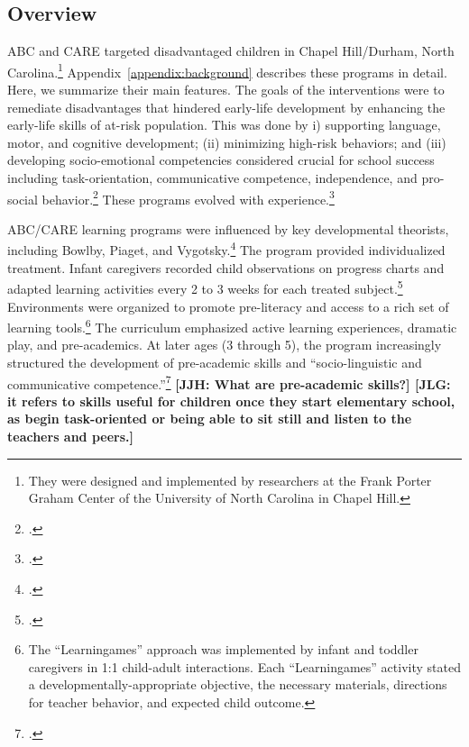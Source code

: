 \subsection{Overview}

ABC and CARE targeted disadvantaged children in Chapel Hill/Durham, North Carolina.\footnote{They were designed and implemented by researchers at the Frank Porter Graham Center of the University of North Carolina in Chapel Hill.} Appendix~\ref{appendix:background} describes these programs in detail. Here, we summarize their main features. The goals of the interventions were to remediate disadvantages that hindered early-life development by enhancing the early-life skills of at-risk population. This was done by i) supporting language, motor, and cognitive development; (ii) minimizing high-risk behaviors; and (iii) developing socio-emotional competencies considered crucial for school success including task-orientation, communicative competence, independence, and pro-social behavior.\footnote{\citet{Ramey_Collier_etal_1976_CarolinaAbecedarianProject, Ramey_etal_1985_Project-CARE_TiECSE, Sparling_1974_Synth_Edu_Infant_SPEECH, Wasik_Ramey_etal_1990_CD, Ramey-etal_2012-ABC}.} These programs evolved with experience.\footnote{ \citet{Ramey-etal_1975_AJoMD, Finkelstein_1982_Day_Care_YC, McGinness_1982_Language-Poverty-Child,Haskins_1985_CD}.}

ABC/CARE learning programs were influenced by key developmental theorists, including Bowlby, Piaget, and Vygotsky.\footnote{\citet{Sparling_1974_Synth_Edu_Infant_SPEECH,Mcginness_1981_Developing,abc2014-2015interviews}.} The program provided individualized treatment. Infant caregivers recorded child observations on progress charts and adapted learning activities every 2 to 3 weeks for each treated subject.\footnote{\citet{Ramey_Collier_etal_1976_CarolinaAbecedarianProject,Campbell_Ramey_1994_CD}.} Environments were organized to promote pre-literacy and access to a rich set of learning tools.\footnote{The ``Learningames'' approach was implemented by infant and toddler caregivers in 1:1 child-adult interactions. Each ``Learningames'' activity stated a developmentally-appropriate objective, the necessary materials, directions for teacher behavior, and expected child outcome.} The curriculum emphasized active learning experiences, dramatic play, and pre-academics. At later ages (3 through 5), the program increasingly structured the development of pre-academic skills and ``socio-linguistic and communicative competence.''\footnote{\citet{Ramey-et-al_1977_Intro-to-ABC, Haskins_1985_CD, Ramey_1981_Modification, Ramey_Campbell_1979_SR, Ramey_Smith_1977_AJMD, Ramey_McGinness_etal_1982_Abecedarianapproach, Sparling_Lewis_1979_BOOKLearninggamesFirstThree,Sparling_Lewis_1984_BOOKLearningGamesThreesFours}.} \textbf{[JJH: What are pre-academic skills?] [JLG: it refers to skills useful for children once they start elementary school, as begin task-oriented or being able to sit still and listen to the teachers and peers.]}

